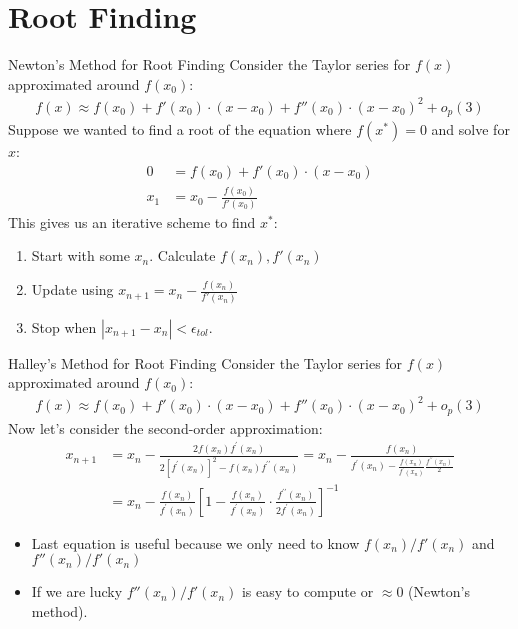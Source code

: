 \section{Root Finding} 

\begin{frame}{Newton's Method for Root Finding}
Consider the Taylor series for $f(x)$ approximated around $f(x_0)$:
\begin{align*}
f(x) \approx f(x_0) + f'(x_0) \cdot (x-x_0) + f''(x_0) \cdot (x-x_0)^2 + o_p(3)
\end{align*}
Suppose we wanted to find a \alert{root} of the equation where $f(x^{*})=0$ and solve for $x$:
\begin{align*}
0 &= f(x_0) + f'(x_0) \cdot (x-x_0) \\
x_1 &= x_0-\frac{f(x_0)}{f'(x_0)} 
\end{align*}
This gives us an \alert{iterative} scheme to find $x^{*}$:
\begin{enumerate}
\item Start with some $x_n$. Calculate $f(x_n),f'(x_n)$
\item Update using $x_{n+1} = x_n - \frac{f(x_n)}{f'(x_n)} $
\item Stop when $|x_{n+1}-x_{n}| < \epsilon_{tol}$.
\end{enumerate}
\end{frame}

\begin{frame}{Halley's Method for Root Finding}
Consider the Taylor series for $f(x)$ approximated around $f(x_0)$:
\begin{align*}
f(x) \approx f(x_0) + f'(x_0) \cdot (x-x_0) + f''(x_0) \cdot (x-x_0)^2 + o_p(3)
\end{align*}
Now let's consider the second-order approximation:
\begin{align*}
x_{n+1}
&=x_{n}-\frac{2 f\left(x_{n}\right) f^{\prime}\left(x_{n}\right)}{2\left[f^{\prime}\left(x_{n}\right)\right]^{2}-f\left(x_{n}\right) f^{\prime \prime}\left(x_{n}\right)}
=x_{n}-\frac{f\left(x_{n}\right)}{f^{\prime}\left(x_{n}\right)-\frac{f\left(x_{n}\right)}{f^{\prime}\left(x_{n}\right)} \frac{f^{\prime \prime}\left(x_{n}\right)}{2}}\\
&=x_{n}-\frac{f\left(x_{n}\right)}{f^{\prime}\left(x_{n}\right)}\left[1-\frac{f\left(x_{n}\right)}{f^{\prime}\left(x_{n}\right)} \cdot \frac{f^{\prime \prime}\left(x_{n}\right)}{2 f^{\prime}\left(x_{n}\right)}\right]^{-1}
\end{align*}
\vspace{-.4cm}
\begin{itemize}
\item Last equation is useful because we only need to know $f(x_n)/f'(x_n)$ and $f''(x_n)/f'(x_n)$
\item If we are lucky $f''(x_n)/f'(x_n)$ is easy to compute or $\approx 0$ (Newton's method).
\end{itemize}
\end{frame}

